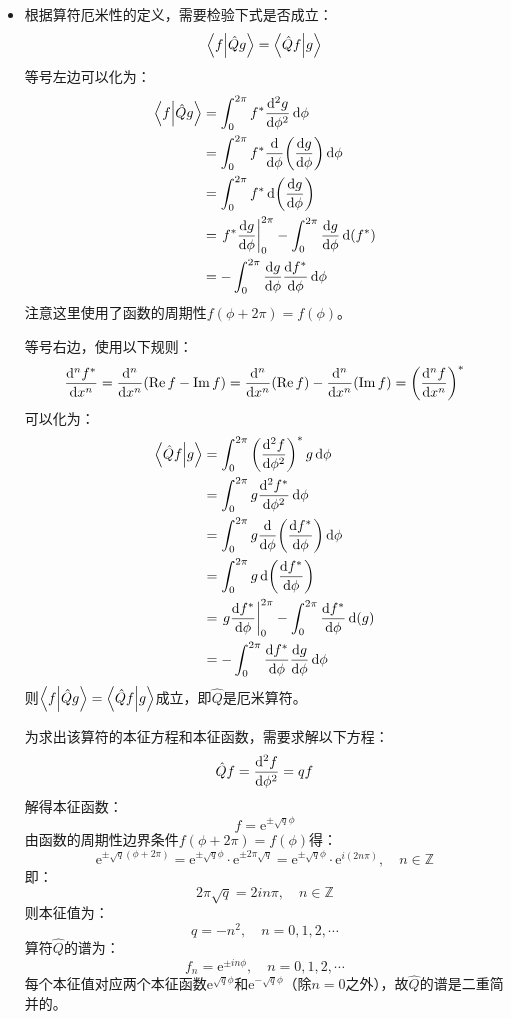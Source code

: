 \documentclass[a4paper,fontset=none]{ctexart}
\begin{document}
    \begin{itemize}
        \item[6.]
        根据算符厄米性的定义，需要检验下式是否成立：
        \[
            \bra{f}\ket{\hat{Q}g} = \bra{\hat{Q}f}\ket{g}
        \]
        等号左边可以化为：
        \begin{align*}
            \bra{f}\ket{\hat{Q}g}
            &= \int_0^{2\pi} f^* \dv[2]{g}{\phi} \dd{\phi} \\
            &= \int_0^{2\pi} f^* \dv{\phi}(\dv{g}{\phi}) \dd{\phi} \\
            &= \int_0^{2\pi} f^* \dd(\dv{g}{\phi}) \\
            &= \eval{f^* \dv{g}{\phi}}_0^{2\pi} - \int_0^{2\pi} \dv{g}{\phi} \dd(f^*) \\
            &= -\int_0^{2\pi} \dv{g}{\phi} \dv{f^*}{\phi} \dd{\phi}
        \end{align*}
        注意这里使用了函数的周期性$f(\phi + 2\pi) = f(\phi)$。

        等号右边，使用以下规则：
        \[
            \dv[n]{f^*}{x} = \dv[n]{x}(\Re f - \Im f) = \dv[n]{x}(\Re f) - \dv[n]{x}(\Im f) =\left(\dv[n]{f}{x}\right)^*
        \]
        可以化为：
        \begin{align*}
            \bra{\hat{Q}f}\ket{g}
            &= \int_0^{2\pi} \left(\dv[2]{f}{\phi}\right)^* g \dd{\phi} \\
            &= \int_0^{2\pi} g \dv[2]{f^*}{\phi} \dd{\phi} \\
            &= \int_0^{2\pi} g \dv{\phi}(\dv{f^*}{\phi}) \dd{\phi} \\
            &= \int_0^{2\pi} g \dd(\dv{f^*}{\phi}) \\
            &= \eval{g \dv{f^*}{\phi}}_0^{2\pi} - \int_0^{2\pi} \dv{f^*}{\phi} \dd(g) \\
            &= -\int_0^{2\pi} \dv{f^*}{\phi} \dv{g}{\phi} \dd{\phi}
        \end{align*}
        则$\bra{f}\ket{\hat{Q}g} = \bra{\hat{Q}f}\ket{g}$成立，即$\hat{Q}$是厄米算符。

        为求出该算符的本征方程和本征函数，需要求解以下方程：
        \[
            \hat{Q} f = \dv[2]{f}{\phi} = qf
        \]
        解得本征函数：
        \[
            f = \mathrm{e}^{\pm\sqrt{q}\phi}
        \]
        由函数的周期性边界条件$f(\phi+2\pi) = f(\phi)$得：
        \[
            \mathrm{e}^{\pm\sqrt{q}(\phi+2\pi)}
            = \mathrm{e}^{\pm\sqrt{q}\phi} \cdot \mathrm{e}^{\pm2\pi\sqrt{q}}
            = \mathrm{e}^{\pm\sqrt{q}\phi} \cdot \mathrm{e}^{i(2n\pi)},\quad n \in \mathbb{Z}
        \]
        即：
        \[
            2\pi \sqrt{q} = 2i n \pi,\quad n \in \mathbb{Z}
        \]
        则本征值为：
        \[
            q = -n^2,\quad n = 0,1,2,\cdots
        \]
        算符$\hat{Q}$的谱为：
        \[
            f_n = \mathrm{e}^{\pm in\phi},\quad n = 0,1,2,\cdots
        \]
        每个本征值对应两个本征函数$\mathrm{e}^{\sqrt{q}\phi}$和$\mathrm{e}^{-\sqrt{q}\phi}$（除$n = 0$之外），故$\hat{Q}$的谱是二重简并的。


\end{itemize}
\end{document}
